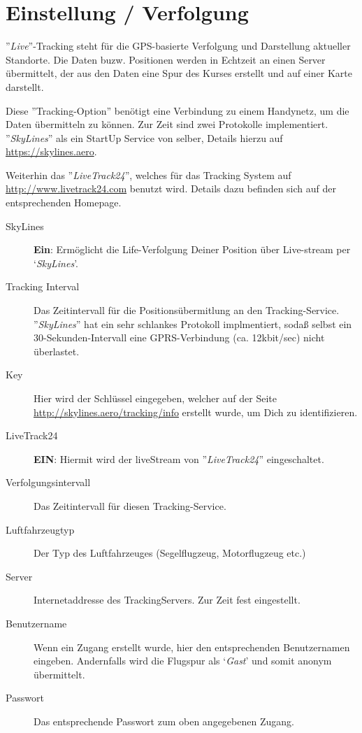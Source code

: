 \section{Einstellung / Verfolgung}

''{\it Live}''-Tracking steht für die GPS-basierte Verfolgung und Darstellung aktueller Standorte.
Die Daten buzw. Positionen werden in Echtzeit an einen Server übermittelt, der aus den Daten
eine Spur des Kurses erstellt und auf einer Karte darstellt.

Diese ''Tracking-Option'' benötigt eine  Verbindung zu einem Handynetz, um die Daten übermitteln zu können.
Zur Zeit sind zwei Protokolle implementiert. ''{\em SkyLines}''  als ein StartUp Service von \xc selber,
Details hierzu auf  \url{https://skylines.aero}.


Weiterhin das ''{\em LiveTrack24}'', welches für das Tracking System auf \url{http://www.livetrack24.com} benutzt wird.
Details dazu befinden sich auf der entsprechenden Homepage.

\begin{description}
\item[SkyLines] {\bf Ein}: Ermöglicht die Life-Verfolgung Deiner Position über Live-stream per `{\em SkyLines}'.
\item[Tracking Interval]  Das Zeitintervall für die Positionsübermitlung an den Tracking-Service.
''{\em SkyLines}''  hat ein sehr schlankes Protokoll implmentiert, sodaß selbst  ein 30-Sekunden-Intervall eine GPRS-Verbindung (ca. 12kbit/sec) nicht überlastet.
\item[Key] Hier wird der Schlüssel eingegeben, welcher auf der Seite \url{http://skylines.aero/tracking/info}
erstellt wurde, um Dich zu identifizieren.
\\
\item[LiveTrack24]  {\bf EIN}: Hiermit wird der liveStream von  ''{\em LiveTrack24}'' eingeschaltet.
\item[Verfolgungsintervall] Das Zeitintervall für diesen Tracking-Service.
\item[Luftfahrzeugtyp]  Der Typ des Luftfahrzeuges (Segelflugzeug, Motorflugzeug etc.)
\item[Server] Internetaddresse des TrackingServers. Zur Zeit fest eingestellt.
\item[Benutzername] Wenn ein Zugang erstellt wurde, hier den entsprechenden Benutzernamen eingeben.
Andernfalls wird die Flugspur als `{\it Gast}'  und somit anonym übermittelt.
\item[Passwort] Das entsprechende Passwort zum oben angegebenen  Zugang.
\end{description}
